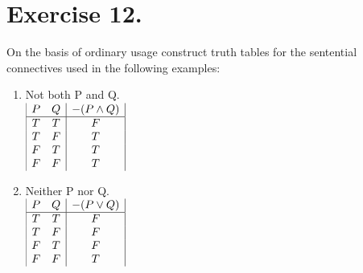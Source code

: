 \documentclass{article}
\begin{document}
\section*{Exercise 12.}
On the basis of ordinary usage construct truth tables for the sentential connectives used in the following examples:
\singlespace
\begin{enumerate}[label=(\alph*)]
\item Not both P and Q.\\
\(
\begin{array}{|c c|c|}
P & Q & -(P \land Q)\\ 
\hline
T & T & F\\
T & F & T\\
F & T & T\\
F & F & T\\
\end{array}
\)
\medskip
    
\item Neither P nor Q.\\
\(
\begin{array}{|c c|c|}
P & Q & -(P \lor Q)\\ 
\hline
T & T & F\\
T & F & F\\
F & T & F\\
F & F & T\\

\end{array}
\)
\medskip
\end{enumerate}
\end{document}
